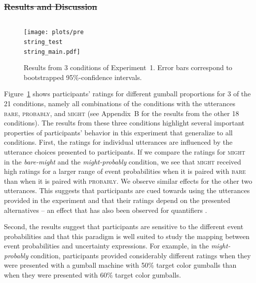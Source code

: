 \documentclass[man, floatsintext]{apa6}
\providecommand{\DIFadd}[1]{{\protect\color{blue}\uwave{#1}}} %
\providecommand{\DIFdel}[1]{{\protect\color{red}\sout{#1}}}                      %
\providecommand{\DIFaddbegin}{} %
\providecommand{\DIFaddend}{} %
\providecommand{\DIFdelbegin}{} %
\providecommand{\DIFdelend}{} %
\newcommand{\DIFscaledelfig}{0.5}
\newlength{\DIFdelgraphicswidth} %
\newlength{\DIFdelgraphicsheight} %
\newcommand{\DIFaddincludegraphics}[2][]{{\color{blue}\fbox{\DIFOincludegraphics[#1]{#2}}}} %
\newcommand{\DIFdelincludegraphics}[2][]{%
\sbox{\DIFdelgraphicsbox}{\DIFOincludegraphics[#1]{#2}}%
\settoboxwidth{\DIFdelgraphicswidth}{\DIFdelgraphicsbox} %
\settoboxtotalheight{\DIFdelgraphicsheight}{\DIFdelgraphicsbox} %
\scalebox{\DIFscaledelfig}{%
\parbox[b]{\DIFdelgraphicswidth}{\usebox{\DIFdelgraphicsbox}\\[-\baselineskip] \rule{\DIFdelgraphicswidth}{0em}}\llap{\resizebox{\DIFdelgraphicswidth}{\DIFdelgraphicsheight}{%
\setlength{\unitlength}{\DIFdelgraphicswidth}%
\begin{picture}(1,1)%
\thicklines\linethickness{2pt} %
{\color[rgb]{1,0,0}\put(0,0){\framebox(1,1){}}}%
{\color[rgb]{1,0,0}\put(0,0){\line( 1,1){1}}}%
{\color[rgb]{1,0,0}\put(0,1){\line(1,-1){1}}}%
\end{picture}%
}\hspace*{3pt}}} %
} %
\DeclareRobustCommand{\DIFaddbegin}{\DIFOaddbegin \let\includegraphics\DIFaddincludegraphics} %
\DeclareRobustCommand{\DIFaddend}{\DIFOaddend \let\includegraphics\DIFOincludegraphics} %
\DeclareRobustCommand{\DIFdelbegin}{\DIFOdelbegin \let\includegraphics\DIFdelincludegraphics} %
\DeclareRobustCommand{\DIFdelend}{\DIFOaddend \let\includegraphics\DIFOincludegraphics} %
\begin{document}
\DIFdelbegin \subsubsection{\DIFdel{Results and Discussion}}
\addtocounter{subsubsection}{-1}%
\DIFdelend \DIFaddbegin \subsection{\DIFadd{Results and Discussion}}
\DIFaddend 

\begin{figure}
\texttt{[image: plots/pre\\string\_test\\string\_main.pdf]} 
\caption{Results from 3 conditions of Experiment~1. Error bars correspond to bootstrapped 95\%-confidence intervals. \label{fig:norming-results-main} }
\end{figure}

Figure~\ref{fig:norming-results-main} shows participants' ratings for different gumball proportions for 3 of the 21 conditions, namely all combinations of the conditions
with the utterances \textsc{bare}, \textsc{probably}, and \textsc{might} (see Appendix~B for the results from the other 18 conditions). 
The results from these three conditions highlight several important properties of participants'
behavior in this experiment that generalize to all conditions.
First, the ratings for individual utterances are influenced by the utterance choices presented to participants.
If we compare the ratings for \textsc{might} in the \textit{bare-might} and the \textit{might-probably} condition, we see that \textsc{might} received high ratings for a larger
range of event probabilities when it is paired with \textsc{bare} than when it is paired with \textsc{probably}. We observe similar effects for the other two utterances.
This suggests that participants are cued towards using the utterances provided in the experiment and that their ratings depend on the presented alternatives -- an effect that
has also been observed for quantifiers \parencite{Degen2016}.

Second, the results suggest that participants are sensitive to the different event probabilities and that this paradigm is well suited to study 
the mapping between event probabilities and uncertainty expressions. For example, in the \textit{might-probably} condition, participants
provided considerably different ratings when they were presented with a gumball machine with 50\% target color gumballs than when they
were presented with 60\% target color gumballs.
\end{document}

